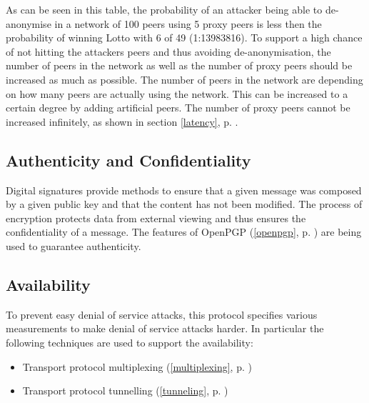 As can be seen in this table, the probability of an attacker being able to
de-anonymise in a network of 100 peers using 5 proxy peers is less then
the probability of winning Lotto with 6 of 49 (1:13983816).
To support a high chance of not hitting the attackers peers and thus
avoiding de-anonymisation, the number of peers in the network as well 
as the number of proxy peers should be increased as much as possible. 
The number of peers in the network are
depending on how many peers are actually using the network. This can be
increased to a certain degree by adding artificial peers.
The number of proxy peers cannot be increased infinitely, 
as shown in section \ref{latency}, p. \pageref{latency}.
\subsection{Authenticity and Confidentiality}
Digital signatures provide methods to ensure that a given message
was composed by a given public key and that the content has not been
modified. 
The process of encryption protects data from external
viewing and thus ensures the confidentiality of a message.
The features of OpenPGP (\ref{openpgp}, p. \pageref{openpgp})
are being used to guarantee authenticity.
\subsection{Availability}
To prevent easy denial of service attacks, this protocol specifies various
measurements to make denial of service attacks harder. In particular
the following techniques are used to support the availability:
\begin{itemize}
\item Transport protocol multiplexing (\ref{multiplexing}, p. \pageref{multiplexing})
\item Transport protocol tunnelling (\ref{tunneling}, p. \pageref{tunneling})
\end{itemize}
